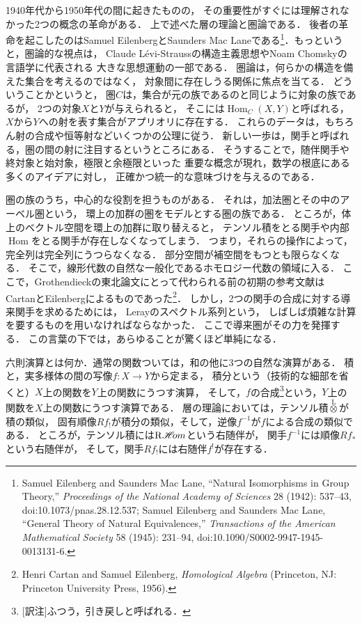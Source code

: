 \documentclass[9pt, a4paper, dvipdfmx]{jlreq}
\theoremstyle{definition}
\newcommand{\Hom}{\mathop{\mathrm{Hom}}\nolimits}
\newcommand{\HOM}{\mathop{\mathscr{H}\hspace{-2pt}om}\nolimits}%
\newcommand{\RHOM}{\mathop{\mathrm{R}\hspace{-1.5pt}\HOM}\nolimits}
\theoremstyle{mystyle}
\numberwithin{equation}{section} %
\begin{document}
1940年代から1950年代の間に起きたものの，
その重要性がすぐには理解されなかった2つの概念の革命がある．
上で述べた層の理論と圏論である．
後者の革命を起こしたのはSamuel EilenbergとSaunders Mac Laneである\footnote[9]{
    Samuel Eilenberg and Saunders Mac Lane, 
    ``Natural Isomorphisms in Group Theory,'' 
    \textit{Proceedings of the National Academy of Sciences} 
    28 (1942): 537--43, doi:10.1073/pnas.28.12.537;
    Samuel Eilenberg and Saunders Mac Lane, ``General Theory of Natural Equivalences,'' 
    \textit{Transactions of the American Mathematical Society} 
    58 (1945): 231--94, doi:10.1090/S0002-9947-1945-0013131-6.
}．もっというと，圏論的な視点は，
Claude L\'evi-Straussの構造主義思想やNoam Chomskyの言語学に代表される
大きな思想運動の一部である．
圏論は，何らかの構造を備えた集合を考えるのではなく，
対象間に存在しうる関係に焦点を当てる．
どういうことかというと，
圏$C$は，集合が元の族であるのと同じように対象の族であるが，
2つの対象$X$と$Y$が与えられると，
そこには$\Hom_C(X,Y)$と呼ばれる，
$X$から$Y$への射を表す集合がアプリオリに存在する．
これらのデータは，もちろん射の合成や恒等射などいくつかの公理に従う．
新しい一歩は，関手と呼ばれる，圏の間の射に注目するというところにある．
そうすることで，随伴関手や終対象と始対象，極限と余極限といった
重要な概念が現れ，数学の根底にある多くのアイデアに対し，
正確かつ統一的な意味づけを与えるのである．

圏の族のうち，中心的な役割を担うものがある．
それは，加法圏とその中のアーベル圏という，
環上の加群の圏をモデルとする圏の族である．
ところが，体上のベクトル空間を環上の加群に取り替えると，
テンソル積をとる関手や内部$\Hom$をとる関手が存在しなくなってしまう．
つまり，それらの操作によって，完全列は完全列にうつらなくなる．
部分空間が補空間をもつとも限らなくなる．
そこで，線形代数の自然な一般化であるホモロジー代数の領域に入る．
ここで，Grothendieckの東北論文にとって代わられる前の初期の参考文献は
CartanとEilenbergによるものであった\footnote[10]{
    Henri Cartan and Samuel Eilenberg, 
    \textit{Homological Algebra} 
    (Princeton, NJ: Princeton University Press, 1956).
}．
しかし，2つの関手の合成に対する導来関手を求めるためには，
Lerayのスペクトル系列という，
しばしば煩雑な計算を要するものを用いなければならなかった．
ここで導来圏がその力を発揮する．
この言葉の下では，あらゆることが驚くほど単純になる．

六則演算とは何か．通常の関数ついては，和の他に3つの自然な演算がある．
積と，実多様体の間の写像$f\colon X\to Y$から定まる，
積分という（技術的な細部を省くと）$X$上の関数を$Y$上の関数にうつす演算，
そして，$f$の合成\footnote{
    [訳注]ふつう，引き戻しと呼ばれる．
}という，$Y$上の関数を$X$上の関数にうつす演算である．
層の理論においては，テンソル積$\overset{\mathrm{L}}{\otimes}$が積の類似，
固有順像$Rf_!$が積分の類似，そして，逆像$f^{-1}$が$f$による合成の類似である．
ところが，テンソル積には$\RHOM$という右随伴が，
関手$f^{-1}$には順像$Rf_{\ast}$という右随伴が，
そして，関手$Rf_{!}$には右随伴$f^!$が存在する．
\end{document}
